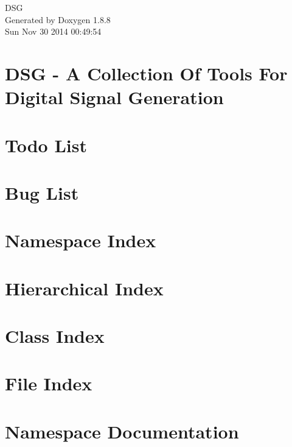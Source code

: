 \documentclass[twoside]{book}
\newcommand{\+}{\discretionary{\mbox{\scriptsize$\hookleftarrow$}}{}{}}
\newcommand{\clearemptydoublepage}{%
  \newpage{\pagestyle{empty}\cleardoublepage}%
}
\begin{document}
\hypersetup{pageanchor=false,
             bookmarks=true,
             bookmarksnumbered=true,
             pdfencoding=unicode
            }
\begin{titlepage}
\vspace*{7cm}
\begin{center}%
{\Large D\+S\+G }\\
\vspace*{1cm}
{\large Generated by Doxygen 1.8.8}\\
\vspace*{0.5cm}
{\small Sun Nov 30 2014 00:49:54}\\
\end{center}
\end{titlepage}
\clearemptydoublepage
\tableofcontents
\clearemptydoublepage
{}
\hypersetup{pageanchor=true}

\chapter{D\+S\+G -\/ A Collection Of Tools For Digital Signal Generation}
\label{index}\hypertarget{index}{}
\chapter{Todo List}
\label{todo}
\hypertarget{todo}{}

\chapter{Bug List}
\label{bug}
\hypertarget{bug}{}

\chapter{Namespace Index}

\chapter{Hierarchical Index}

\chapter{Class Index}

\chapter{File Index}

\chapter{Namespace Documentation}










\end{document}
